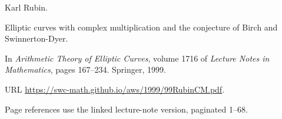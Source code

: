 Karl Rubin.

\newblock Elliptic curves with complex multiplication and the conjecture of
  {B}irch and {S}winnerton-{D}yer.

\newblock In \emph{Arithmetic Theory of Elliptic Curves}, volume 1716 of
  \emph{Lecture Notes in Mathematics}, pages 167--234. Springer, 1999.

\newblock URL \url{https://swc-math.github.io/aws/1999/99RubinCM.pdf}.

\newblock Page references use the linked lecture-note version, paginated 1--68.